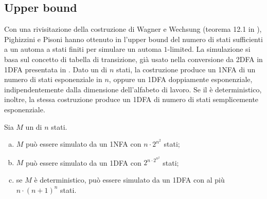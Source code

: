 \subsection{Upper bound}\label{subs:a1l:up}
Con una rivisitazione della costruzione di Wagner e Wechsung (teorema 12.1 in \cite{Wagner:86:compCompl}), Pighizzini e Pisoni hanno ottenuto in \cite{Pighizzini:14:limitedRE} l'upper bound del numero di stati sufficienti a un automa a stati finiti per simulare un automa $1$-limited. La simulazione si basa sul concetto di tabella di transizione, già usato nella conversione da 2DFA in 1DFA presentata in \cite{Shepherdson:59:reduction2to1way}. Dato un  di $n$ stati, la costruzione produce un 1NFA di un numero di stati esponenziale in $n$, oppure un 1DFA doppiamente esponenziale, indipendentemente dalla dimensione dell'alfabeto di lavoro. Se il  è deterministico, inoltre, la stessa costruzione produce un 1DFA di numero di stati semplicemente esponenziale.
\begin{theor}\label{thm:a1l:upper}
	Sia $M$ un  di $n$ stati.
	\begin{enumerate}[(a)]
		\item \label{itm:a1l:up:NFA} $M$ può essere simulato da un 1NFA con $n\cdot2^{n^2}$ stati;
		\item \label{itm:a1l:up:DFA} $M$ può essere simulato da un 1DFA con $2^{n\cdot2^{n^2}}$ stati;
		\item \label{itm:a1l:up:det} se $M$ è deterministico, può essere simulato da un 1DFA con al più $n\cdot (n+1)^n$ stati.
	\end{enumerate}
\end{theor}
